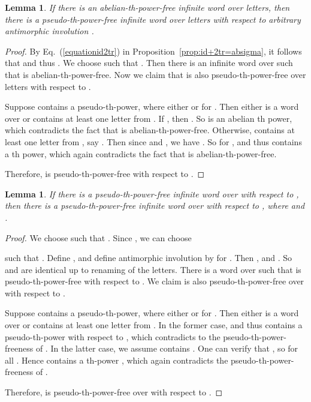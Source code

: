 \documentclass[12pt]{article}
\newtheorem{lemma}[theorem]{Lemma}
\begin{document}
\begin{lemma}\label{lemma:lemma1}
If there is an abelian-th-power-free infinite word over 
letters, then there is a pseudo-th-power-free infinite word over
 letters with respect to arbitrary antimorphic involution
.
\end{lemma}
\begin{proof}
By Eq.~(\ref{equationid2tr}) in
Proposition~\ref{prop:id+2tr=absigma}, it follows that
 and thus
. We choose
 such that
. Then there is an infinite word  over 
such that  is abelian-th-power-free. Now we claim that  is
also pseudo-th-power-free over  letters with respect to
.

Suppose  contains a pseudo-th-power, where
either  or  for . Then
either  is a word over  or  contains at least
one letter from . If , then
. So  is an abelian
th power, which contradicts the fact that  is
abelian-th-power-free. Otherwise,  contains at least one
letter from , say . Then since  and
, we have
. So
 for , and thus  contains a th power,
which again contradicts the fact that  is
abelian-th-power-free.

Therefore,  is pseudo-th-power-free with respect to .
\end{proof}


\begin{lemma}\label{lemma:lemma2}
If there is a pseudo-th-power-free infinite word over 
with respect to , then there is a pseudo-th-power-free
infinite word over  with respect to , where
 and
.
\end{lemma}
\begin{proof}
We choose  such that
. Since
,
we can choose

such that . Define
, and
define antimorphic involution  by  for . Then
,
 and
. So  and
 are identical up to renaming of the letters. There is a
word  over  such that  is pseudo-th-power-free
with respect to . We claim  is also
pseudo-th-power-free over  with respect to .

Suppose  contains a pseudo-th-power, where
either  or  for . Then
either  is a word over  or  contains at
least one letter from .
In the former case,  and thus 
contains a pseudo-th-power with respect to , which
contradicts to the pseudo-th-power-freeness of . In the latter
case, we assume  contains
. One can verify
that , so  for all
. Hence  contains a th-power , which again contradicts the pseudo-th-power-freeness of
.

Therefore,  is pseudo-th-power-free over  with
respect to .
\end{proof}
\end{document}
